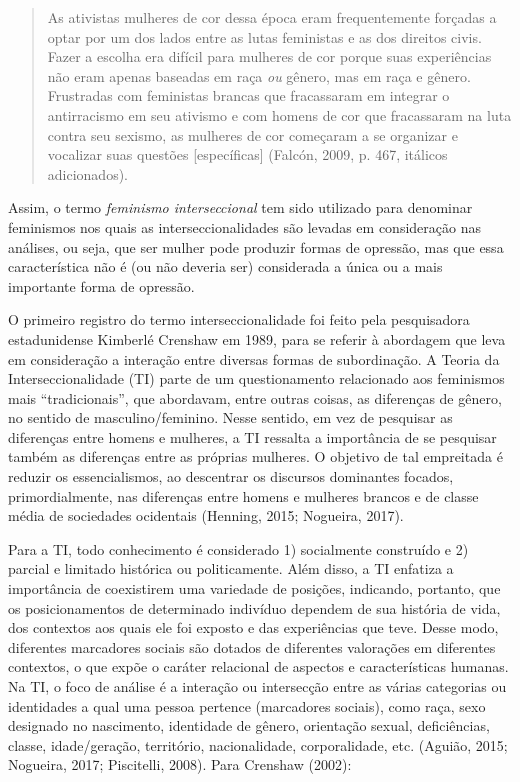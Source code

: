 \begin{quote}
    As ativistas mulheres de cor dessa época eram frequentemente forçadas a optar por um dos lados entre as lutas feministas e as dos direitos civis. Fazer a escolha era difícil para mulheres de cor porque suas experiências não eram apenas baseadas em raça \textit{ou} gênero, mas em raça e gênero. Frustradas com feministas brancas que fracassaram em integrar o antirracismo em seu ativismo e com homens de cor que fracassaram na luta contra seu sexismo, as mulheres de cor começaram a se organizar e vocalizar suas questões [específicas] (Falcón, 2009, p. 467, itálicos adicionados).
\end{quote}

Assim, o termo \textit{feminismo interseccional} tem sido utilizado para denominar feminismos nos quais as interseccionalidades são levadas em consideração nas análises, ou seja, que ser mulher pode produzir formas de opressão, mas que essa característica não é (ou não deveria ser) considerada a única ou a mais importante forma de opressão. 

O primeiro registro do termo interseccionalidade foi feito pela pesquisadora estadunidense Kimberlé Crenshaw em 1989, para se referir à abordagem que leva em consideração a interação entre diversas formas de subordinação. A Teoria da Interseccionalidade (TI) parte de um questionamento relacionado aos feminismos mais ``tradicionais'', que abordavam, entre outras coisas, as diferenças de gênero, no sentido de masculino/feminino. Nesse sentido, em vez de pesquisar as diferenças entre homens e mulheres, a TI ressalta a importância de se pesquisar também as diferenças entre as próprias mulheres. O objetivo de tal empreitada é reduzir os essencialismos, ao descentrar os discursos dominantes focados, primordialmente, nas diferenças entre homens e mulheres brancos e de classe média de sociedades ocidentais (Henning, 2015; Nogueira, 2017).

Para a TI, todo conhecimento é considerado 1) socialmente construído e 2) parcial e limitado histórica ou politicamente. Além disso, a TI enfatiza a importância de coexistirem uma variedade de posições, indicando, portanto, que os posicionamentos de determinado indivíduo dependem de sua história de vida, dos contextos aos quais ele foi exposto e das experiências que teve. Desse modo, diferentes marcadores sociais são dotados de diferentes valorações em diferentes contextos, o que expõe o caráter relacional de aspectos e características humanas. Na TI, o foco de análise é a interação ou intersecção entre as várias categorias ou identidades a qual uma pessoa pertence (marcadores sociais), como raça, sexo designado no nascimento, identidade de gênero, orientação sexual, deficiências, classe, idade/geração, território, nacionalidade, corporalidade, etc. (Aguião, 2015; Nogueira, 2017; Piscitelli, 2008). Para Crenshaw (2002):

